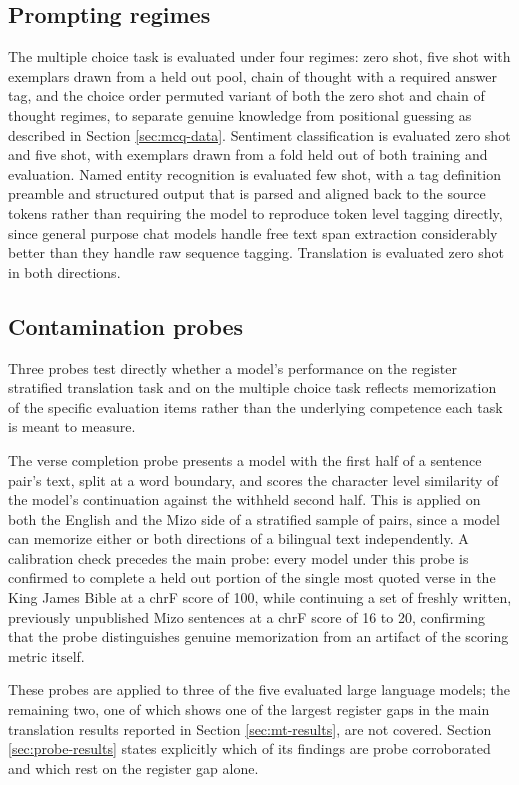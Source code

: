 \documentclass[11pt,a4paper]{article}
\begin{document}
\subsection{Prompting regimes}

The multiple choice task is evaluated under four regimes: zero shot, five shot with exemplars drawn from a held out pool, chain of thought with a required answer tag, and the choice order permuted variant of both the zero shot and chain of thought regimes, to separate genuine knowledge from positional guessing as described in Section \ref{sec:mcq-data}. Sentiment classification is evaluated zero shot and five shot, with exemplars drawn from a fold held out of both training and evaluation. Named entity recognition is evaluated few shot, with a tag definition preamble and structured output that is parsed and aligned back to the source tokens rather than requiring the model to reproduce token level tagging directly, since general purpose chat models handle free text span extraction considerably better than they handle raw sequence tagging. Translation is evaluated zero shot in both directions.

\subsection{Contamination probes}
\label{sec:probes}

Three probes test directly whether a model's performance on the register stratified translation task and on the multiple choice task reflects memorization of the specific evaluation items rather than the underlying competence each task is meant to measure.

The verse completion probe presents a model with the first half of a sentence pair's text, split at a word boundary, and scores the character level similarity of the model's continuation against the withheld second half. This is applied on both the English and the Mizo side of a stratified sample of pairs, since a model can memorize either or both directions of a bilingual text independently. A calibration check precedes the main probe: every model under this probe is confirmed to complete a held out portion of the single most quoted verse in the King James Bible at a chrF score of 100, while continuing a set of freshly written, previously unpublished Mizo sentences at a chrF score of 16 to 20, confirming that the probe distinguishes genuine memorization from an artifact of the scoring metric itself.

These probes are applied to three of the five evaluated large language models; the remaining two, one of which shows one of the largest register gaps in the main translation results reported in Section \ref{sec:mt-results}, are not covered. Section \ref{sec:probe-results} states explicitly which of its findings are probe corroborated and which rest on the register gap alone.
\end{document}
